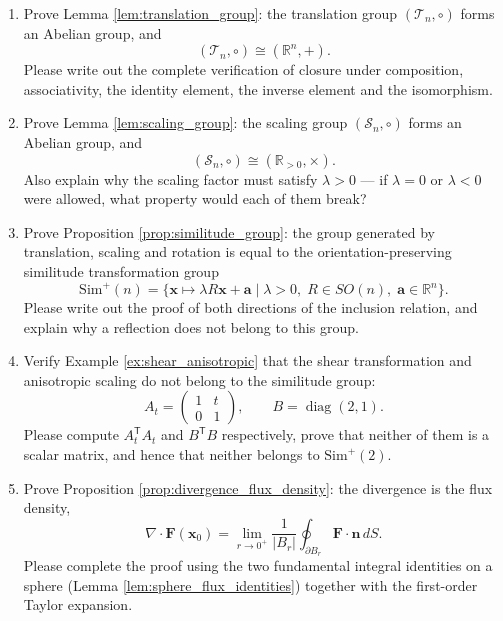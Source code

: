 \begin{enumerate}[leftmargin=3em, label=\textbf{Exercise \arabic*}]
    \item Prove Lemma \ref{lem:translation_group}: the translation group
    $(\mathcal{T}_n,\circ)$ forms an Abelian group, and
    \[
    (\mathcal{T}_n,\circ)\cong(\mathbb{R}^n,+).
    \]
    Please write out the complete verification of closure under composition, associativity, the identity element, the inverse element and the isomorphism.

    \item Prove Lemma \ref{lem:scaling_group}: the scaling group
    $(\mathcal{S}_n,\circ)$ forms an Abelian group, and
    \[
    (\mathcal{S}_n,\circ)\cong(\mathbb{R}_{>0},\times).
    \]
    Also explain why the scaling factor must satisfy $\lambda>0$ --- if $\lambda=0$ or
    $\lambda<0$ were allowed, what property would each of them break?

    \item Prove Proposition \ref{prop:similitude_group}:
    the group generated by translation, scaling and rotation is equal to the orientation-preserving similitude transformation group
    \[
    \mathrm{Sim}^{+}(n)=\{\mathbf{x}\mapsto\lambda R\mathbf{x}+\mathbf{a}\mid
    \lambda>0,\;R\in SO(n),\;\mathbf{a}\in\mathbb{R}^n\}.
    \]
    Please write out the proof of both directions of the inclusion relation, and explain why a reflection does not belong to this group.

    \item Verify Example \ref{ex:shear_anisotropic} that the shear transformation and anisotropic scaling do not belong to the similitude group:
    \[
    A_t=\begin{pmatrix}1&t\\0&1\end{pmatrix},\qquad
    B=\operatorname{diag}(2,1).
    \]
    Please compute $A_t^{\mathsf T}A_t$ and $B^{\mathsf T}B$ respectively,
    prove that neither of them is a scalar matrix, and hence that neither belongs to $\mathrm{Sim}^{+}(2)$.

    \item Prove Proposition \ref{prop:divergence_flux_density}:
    the divergence is the flux density,
    \[
    \nabla\cdot\mathbf{F}(\mathbf{x}_0)
    =\lim_{r\to0^+}\frac{1}{|B_r|}\oint_{\partial B_r}\mathbf{F}\cdot\mathbf{n}\,dS.
    \]
    Please complete the proof using the two fundamental integral identities on a sphere (Lemma \ref{lem:sphere_flux_identities})
    together with the first-order Taylor expansion.


\end{enumerate}
